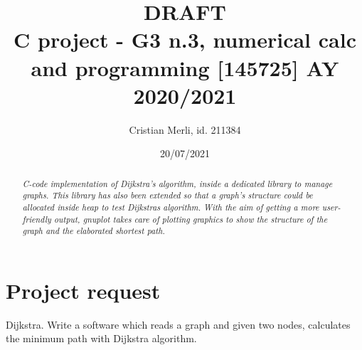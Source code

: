 \documentclass{article}                                                                                                     %
\title{DRAFT \\                                                                                                             %
\large C project - G3 n.3, numerical calc and programming [145725] AY 2020/2021}                                            %
\author{Cristian Merli, id. 211384}                                                                                         %
\date{20/07/2021}                                                                                                           %
\begin{document}

\maketitle                                                                                                                  %

\vspace{1cm}                                                                                                                %
  \begin{abstract}                                                                                                          %
    \noindent \textit{C-code implementation of Dijkstra's algorithm, inside a dedicated library to manage graphs.           %
    This library has also been extended so that a graph's structure could be allocated inside heap to test
    Dijkstras algorithm. With the aim of getting a more user-friendly output, gnuplot takes care of plotting graphics
    to show the structure of the graph and the elaborated shortest path.}
  \end{abstract}                                                                                                            %
\vspace{3.5cm}                                                                                                              %

\vspace{3.5cm}                                                                                                              %
  \tableofcontents                                                                                                          %
\pagebreak                                                                                                                  %

\section{Project request}                                                                                                   %
\label{sec:project_request}                                                                                                 %
  Dijkstra. Write a software which reads a graph and given two nodes, calculates the minimum path with Dijkstra             %
  algorithm.
\end{document}
